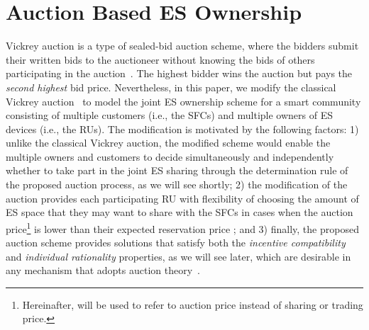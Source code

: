 \documentclass[journal,10pt]{IEEEtran}
\begin{document}
\section{Auction Based ES Ownership}\label{sec:auction-ownership}
Vickrey auction is a type of sealed-bid auction scheme, where the bidders submit their written bids to the auctioneer without knowing the bids of others participating in the auction~\cite{Vickrey-JF:1961}. The highest bidder wins the auction but pays the \emph{second highest} bid price. Nevertheless, in this paper, we modify the classical Vickrey auction~\cite{Vickrey-JF:1961} to model the joint ES ownership scheme for a smart community consisting of multiple customers (i.e., the SFCs) and multiple owners of ES devices (i.e., the RUs). The modification is motivated by the following factors: 1) unlike the classical Vickrey auction, the modified scheme would enable the multiple owners and customers to decide simultaneously and independently whether to take part in the joint ES sharing through the determination rule of the proposed auction process, as we will see shortly; 2) the modification of the auction provides each participating RU  with flexibility of choosing the amount of ES space that they may want to share with the SFCs in cases when the auction price\footnote{Hereinafter,  will be used to refer to auction price instead of sharing or trading price.}  is lower than their expected reservation price ; and 3) finally, the proposed auction scheme provides solutions that satisfy both the \emph{incentive compatibility} and \emph{individual rationality} properties, as we will see later, which are desirable in any mechanism that adopts auction theory~\cite{Saad-CSmartgridComm:2011}.
\end{document}
